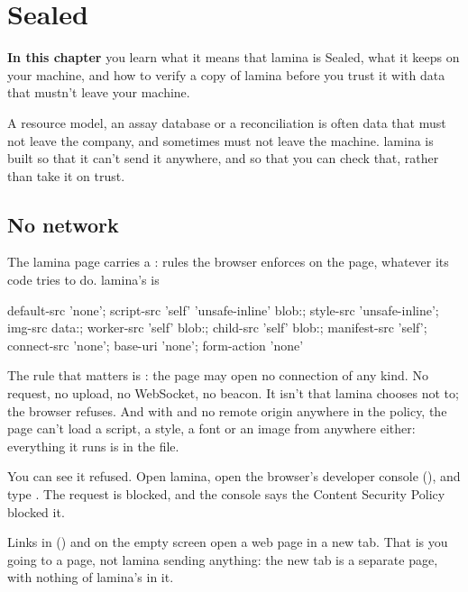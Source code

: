 \chapter{Sealed}\label{ch:sealed}
\begin{goals}
\textbf{In this chapter} you learn what it means that lamina is Sealed, what it keeps on your machine,
and how to verify a copy of lamina before you trust it with data that mustn't leave your machine.
\end{goals}

A resource model, an assay database or a reconciliation is often data that must not leave the company,
and sometimes must not leave the machine. lamina is built so that it can't send it anywhere, and so that
you can check that, rather than take it on trust.

\section{No network}\label{sec:no-network}

The lamina page carries a : rules the browser enforces on the page,
whatever its code tries to do. lamina's is

\begin{codeblock}
default-src 'none'; script-src 'self' 'unsafe-inline' blob:;
style-src 'unsafe-inline'; img-src data:; worker-src 'self' blob:;
child-src 'self' blob:; manifest-src 'self'; connect-src 'none';
base-uri 'none'; form-action 'none'
\end{codeblock}

The rule that matters is : the page may open no connection of any kind. No
request, no upload, no WebSocket, no beacon. It isn't that lamina chooses not to; the browser refuses.
And with  and no remote origin anywhere in the policy, the page can't load a
script, a style, a font or an image from anywhere either: everything it runs is in the file.

You can see it refused. Open lamina, open the browser's developer console (), and type
. The request is blocked, and the console says the Content Security Policy
blocked it.

\begin{note}
Links in  () and on the empty screen open a web page in
a new tab. That is you going to a page, not lamina sending anything: the new tab is a separate page, with
nothing of lamina's in it.
\end{note}

